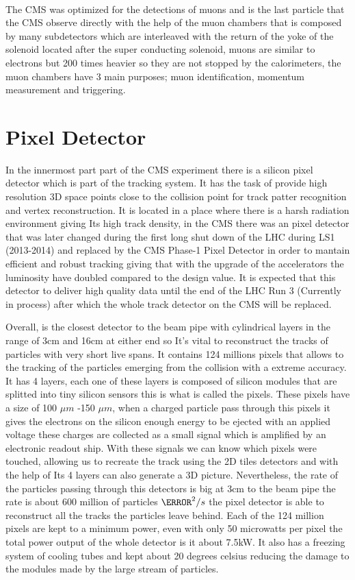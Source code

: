 \\
The CMS was optimized for the detections of muons and is the last particle that the CMS observe directly with the help of the muon chambers that is composed by many subdetectors which are interleaved with the return of the yoke of the solenoid located after the super conducting solenoid, muons are similar to electrons but 200 times heavier so they are not stopped by the calorimeters, the muon chambers have 3 main purposes; muon identification, momentum measurement and triggering. \cite{CMS2}

\section{Pixel Detector}

In the innermost part part of the CMS experiment there is a silicon pixel detector which is part of the tracking system. It has the task of provide high resolution 3D space points close to the collision point for track patter recognition and vertex reconstruction. It is located in a place where there is a harsh radiation environment giving Its high track density, in the CMS there was an pixel detector that was later changed during the first long shut down of the LHC during LS1 (2013-2014) and replaced by the CMS Phase-1 Pixel Detector in order to mantain efficient and robust tracking giving that with the upgrade of the accelerators the luminosity have doubled compared to the design value. It is expected that this detector to deliver high quality data until the end of the LHC Run 3 (Currently in process) after which the whole track detector on the CMS will be replaced.
   
Overall, is the closest detector to the beam pipe with cylindrical layers in the range of 3cm and 16cm at either end so It's vital to reconstruct the tracks of particles with very short live spans. It contains 124 millions pixels that allows to the tracking of the particles emerging from the collision with a extreme accuracy. It has 4 layers, each one of these layers is composed of silicon modules that are splitted into tiny silicon sensors this is what is called the pixels. These pixels have a size of 100 $\mu m$ -150 $\mu m$, when a charged particle pass through this pixels it gives the electrons on the silicon enough energy to be ejected with an applied voltage these charges are collected as a small signal which is amplified by an electronic readout ship. With these signals we can know which pixels were touched, allowing  us to recreate the track using the 2D tiles detectors and with the help of Its 4 layers can also generate a 3D picture. Nevertheless, the rate of the particles passing through this detectors is big at 3cm to the beam pipe the rate is about 600 million of particles $\cm^{2} / s$ the pixel detector is able to reconstruct all the tracks the particles leave behind. Each of the 124 million pixels are kept to a minimum power, even with only 50 microwatts per pixel the total power output of the whole detector is it about 7.5kW. It also has a freezing system of cooling tubes and kept about 20 degrees celsius reducing the damage to the modules made by the large stream of particles. 

